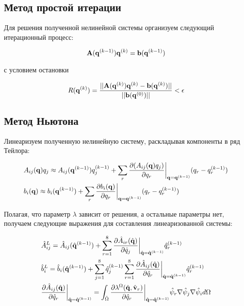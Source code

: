 \documentclass[12pt]{article}
\begin{document}
\subsection{Метод простой итерации}

\noindent
Для решения полученной нелинейной системы организуем следующий итерационный процесс:

\begin{align}
  {\bf A}({\bf q}^{(k-1)}){\bf q}^{(k)} = {\bf b}({\bf q}^{(k-1)})
\end{align}

\vskip 5mm
\noindent
с условием остановки

\begin{align} \label{eq:1}
  R({\bf q}^{(k)}) = \frac{||{\bf A}({\bf q}^{(k)}){\bf q}^{(k)} - {\bf b}({\bf q}^{(k)})||}
  {||{\bf b}({\bf q}^{(0)})||} < \epsilon
\end{align}

\subsection{Метод Ньютона}

\noindent
Линеаризуем полученную нелинейную систему, раскладывая компоненты в ряд Тейлора:

\begin{align}
  &A_{ij}({\bf q})q_j \approx A_{ij}({\bf q}^{(k-1)})q_j^{(k-1)} +
    \sum_{r}\frac{\partial (A_{ij}({\bf q})q_j)}%
      {\partial q_r}\bigg\rvert_{{\bf q} = {\bf q}^{(k-1)}}(q_r - q_r^{(k-1)}) \\
  &b_i({\bf q}) \approx b_i({\bf q}^{(k-1)}) +
    \sum_{r}\frac{\partial b_{i}({\bf q})}%
      {\partial q_r}\bigg\rvert_{{\bf q} = {\bf q}^{(k-1)}}(q_r - q_r^{(k-1)})
\end{align}

\vskip 5mm
\noindent
Полагая, что параметр $\lambda$ зависит от решения, а остальные параметры нет,
получаем следующие выражения для составления линеаризованной системы:

\begin{align}
  &\hat{A}^{L}_{ij} = \hat{A}_{ij}(\hat{{\bf q}}^{(k-1)}) +
    \sum_{r=1}^{8}\frac{\partial \hat{A}_{ir}(\hat{\bf q})}%
      {\partial \hat{q}_j}\bigg\rvert_{\hat{\bf q} = \hat{\bf q}^{(k-1)}}
        \hat{q}_{r}^{(k-1)} \\
  &\hat{b}^{L}_{i} = \hat{b}_{i}(\hat{{\bf q}}^{(k-1)}) +
    \sum_{j=1}^{8}\hat{q}^{(k-1)}_{j}
      \sum_{r=1}^{8}\frac{\partial \hat{A}_{ij}(\hat{\bf q})}%
        {\partial \hat{q}_r}\bigg\rvert_{\hat{\bf q} = \hat{\bf q}^{(k-1)}}
          \hat{q}_{r}^{(k-1)} \\
  &\frac{\partial \hat{A}_{ij}(\hat{\bf q})}{\partial \hat{q}_r}
    \bigg\rvert_{\hat{\bf q} = \hat{\bf q}^{(k-1)}} =
    \int_{\hat{\Omega}}\frac{\partial\lambda^{\Omega}(\hat{\bf q}, \hat{\bf v}_r)}
        {\partial\hat{q}_r}\bigg\rvert_{\hat{\bf q} = \hat{\bf q}^{(k-1)}}
      \hat{\psi}_r\nabla\hat{\psi}_j\nabla\hat{\psi}_i d\Omega
\end{align}
\end{document}
